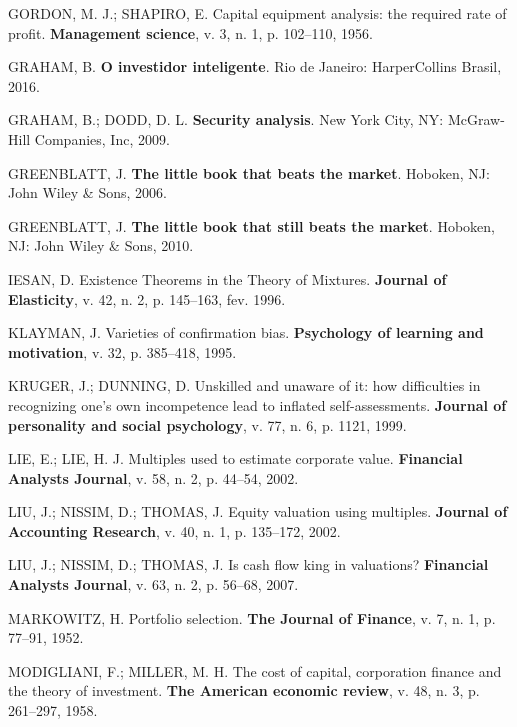 \documentclass[grad,numbers]{coppe}
\newenvironment{cslreferences}%
  {}%
  {\par}
\begin{document}
\begin{cslreferences}
  \leavevmode\hypertarget{ref-gordon1956}{}%
  GORDON, M. J.; SHAPIRO, E. Capital equipment analysis: the required rate of profit. \textbf{Management science}, v. 3, n. 1, p. 102--110, 1956.

  \leavevmode\hypertarget{ref-graham2016}{}%
  GRAHAM, B. \textbf{O investidor inteligente}. Rio de Janeiro: HarperCollins Brasil, 2016.

  \leavevmode\hypertarget{ref-graham2009}{}%
  GRAHAM, B.; DODD, D. L. \textbf{Security analysis}. New York City, NY: McGraw-Hill Companies, Inc, 2009.

  \leavevmode\hypertarget{ref-greenblatt2006}{}%
  GREENBLATT, J. \textbf{The little book that beats the market}. Hoboken, NJ: John Wiley \& Sons, 2006.

  \leavevmode\hypertarget{ref-greenblatt2010}{}%
  GREENBLATT, J. \textbf{The little book that still beats the market}. Hoboken, NJ: John Wiley \& Sons, 2010.

  \leavevmode\hypertarget{ref-article-example}{}%
  IESAN, D. Existence Theorems in the Theory of Mixtures. \textbf{Journal of Elasticity}, v. 42, n. 2, p. 145--163, fev. 1996.

  \leavevmode\hypertarget{ref-klayman1995}{}%
  KLAYMAN, J. Varieties of confirmation bias. \textbf{Psychology of learning and motivation}, v. 32, p. 385--418, 1995.

  \leavevmode\hypertarget{ref-kruger1999}{}%
  KRUGER, J.; DUNNING, D. Unskilled and unaware of it: how difficulties in recognizing one's own incompetence lead to inflated self-assessments. \textbf{Journal of personality and social psychology}, v. 77, n. 6, p. 1121, 1999.

  \leavevmode\hypertarget{ref-lie2002}{}%
  LIE, E.; LIE, H. J. Multiples used to estimate corporate value. \textbf{Financial Analysts Journal}, v. 58, n. 2, p. 44--54, 2002.

  \leavevmode\hypertarget{ref-liu2002}{}%
  LIU, J.; NISSIM, D.; THOMAS, J. Equity valuation using multiples. \textbf{Journal of Accounting Research}, v. 40, n. 1, p. 135--172, 2002.

  \leavevmode\hypertarget{ref-liu2007}{}%
  LIU, J.; NISSIM, D.; THOMAS, J. Is cash flow king in valuations? \textbf{Financial Analysts Journal}, v. 63, n. 2, p. 56--68, 2007.

  \leavevmode\hypertarget{ref-markowitz1952}{}%
  MARKOWITZ, H. Portfolio selection. \textbf{The Journal of Finance}, v. 7, n. 1, p. 77--91, 1952.

  \leavevmode\hypertarget{ref-modigliani1958}{}%
  MODIGLIANI, F.; MILLER, M. H. The cost of capital, corporation finance and the theory of investment. \textbf{The American economic review}, v. 48, n. 3, p. 261--297, 1958.


\end{cslreferences}
\end{document}
